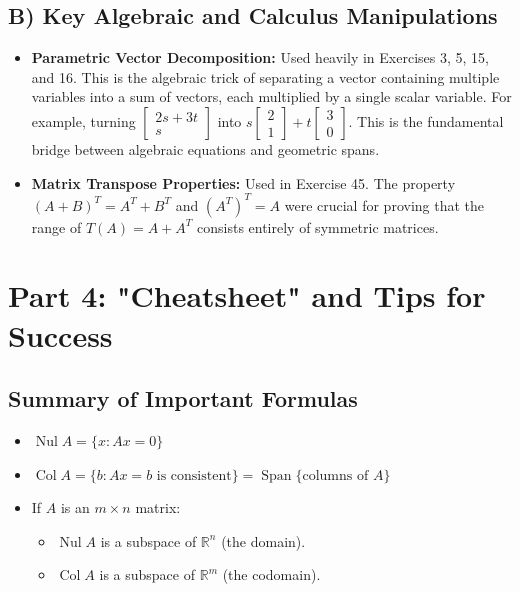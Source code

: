 \documentclass[11pt]{article}
\begin{document}
\subsection{B) Key Algebraic and Calculus Manipulations}
\begin{itemize}
    \item \textbf{Parametric Vector Decomposition:} Used heavily in Exercises 3, 5, 15, and 16. This is the algebraic trick of separating a vector containing multiple variables into a sum of vectors, each multiplied by a single scalar variable. For example, turning $\begin{bmatrix} 2s+3t \\ s \end{bmatrix}$ into $s\begin{bmatrix} 2 \\ 1 \end{bmatrix} + t\begin{bmatrix} 3 \\ 0 \end{bmatrix}$. This is the fundamental bridge between algebraic equations and geometric spans.
    \item \textbf{Matrix Transpose Properties:} Used in Exercise 45. The property $(A+B)^T = A^T + B^T$ and $(A^T)^T = A$ were crucial for proving that the range of $T(A) = A + A^T$ consists entirely of symmetric matrices.
\end{itemize}

\newpage

\section{Part 4: "Cheatsheet" and Tips for Success}

\subsection{Summary of Important Formulas}
\begin{itemize}
    \item $\operatorname{Nul} A = \{ x : Ax = 0 \}$
    \item $\operatorname{Col} A = \{ b : Ax = b \text{ is consistent} \} = \operatorname{Span}\{\text{columns of } A\}$
    \item If $A$ is an $m \times n$ matrix:
    \begin{itemize}
        \item $\operatorname{Nul} A$ is a subspace of $\mathbb{R}^n$ (the domain).
        \item $\operatorname{Col} A$ is a subspace of $\mathbb{R}^m$ (the codomain).
    \end{itemize}
\end{itemize}
\end{document}
